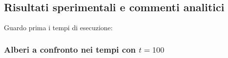 \newpage
\subsection{Risultati sperimentali e commenti analitici}
\label{sec:RisultatiSperimentaliCommentiAnalitici_1}

Guardo prima i tempi di esecuzione:

\subsubsection{Alberi a confronto nei tempi con $t = 100$}

